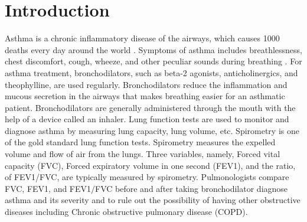 \documentclass{article}
\begin{document}
\section{Introduction}

Asthma is a chronic inflammatory disease of the airways, which causes 1000 deaths every day around the world \cite{networkglobal}. Symptoms of asthma includes breathlessness, chest discomfort, cough, wheeze, and other peculiar sounds during breathing \cite{martinez2007genes}.
For asthma treatment, bronchodilators, such as beta-2 agonists, anticholinergics, and theophylline, are used regularly. Bronchodilators reduce the inflammation and mucous secretion in the airways that makes breathing easier for an asthmatic patient. 
Bronchodilators are generally administered through the mouth with the help of a device called an inhaler.
Lung function tests are used to monitor and diagnose asthma by measuring lung capacity, lung volume, etc. Spirometry is one of the gold standard lung function tests. 
Spirometry measures the expelled volume and flow of air from the lungs.
Three variables, namely, Forced vital capacity (FVC), Forced expiratory volume in one second (FEV1), and the ratio, of FEV1/FVC, are typically measured by spirometry. Pulmonologists compare FVC, FEV1, and FEV1$/$FVC before and after taking bronchodilator diagnose asthma and its severity and to rule out the possibility of having other obstructive diseases including Chronic obstructive pulmonary disease (COPD). 




\end{document}
